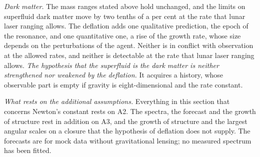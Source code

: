 \emph{Dark matter.} The mass ranges stated above hold unchanged, and
the limits on superfluid dark matter move by two tenths of a per cent at the rate that lunar laser
ranging allows. The deflation adds one qualitative prediction, the epoch of the resonance, and one
quantitative one, a rise of the growth rate, whose size depends on the perturbations of the agent.
Neither is in conflict with observation at the allowed rates, and neither is detectable at the rate
that lunar laser ranging allows. \emph{The hypothesis that the superfluid is the dark matter is
neither strengthened nor weakened by the deflation.} It acquires a history, whose observable part is
empty if gravity is eight-dimensional and the rate constant.

\emph{What rests on the additional assumptions.} Everything in this section that concerns Newton's
constant rests on A2. The spectra, the forecast and the growth of structure rest in addition on A3,
and the growth of structure and the largest angular scales on a closure that the hypothesis of
deflation does not supply. The forecasts are for mock data without gravitational lensing; no
measured spectrum has been fitted.
